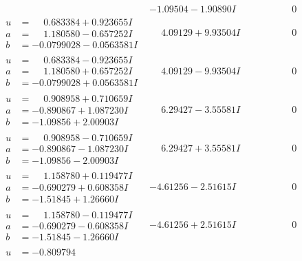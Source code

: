 \documentclass[1p]{elsarticle_modified}
\theoremstyle{definition}
\begin{document}
$$\begin{array}{c|c|c}
 & -1.09504 - 1.90890 I & \phantom{-0.000000 } 0 \\ \hline\begin{aligned}
u &= \phantom{-}0.683384 + 0.923655 I \\
a &= \phantom{-}1.180580 - 0.657252 I \\
b &= -0.0799028 - 0.0563581 I\end{aligned}
 & \phantom{-}4.09129 + 9.93504 I & \phantom{-0.000000 } 0 \\ \hline\begin{aligned}
u &= \phantom{-}0.683384 - 0.923655 I \\
a &= \phantom{-}1.180580 + 0.657252 I \\
b &= -0.0799028 + 0.0563581 I\end{aligned}
 & \phantom{-}4.09129 - 9.93504 I & \phantom{-0.000000 } 0 \\ \hline\begin{aligned}
u &= \phantom{-}0.908958 + 0.710659 I \\
a &= -0.890867 + 1.087230 I \\
b &= -1.09856 + 2.00903 I\end{aligned}
 & \phantom{-}6.29427 - 3.55581 I & \phantom{-0.000000 } 0 \\ \hline\begin{aligned}
u &= \phantom{-}0.908958 - 0.710659 I \\
a &= -0.890867 - 1.087230 I \\
b &= -1.09856 - 2.00903 I\end{aligned}
 & \phantom{-}6.29427 + 3.55581 I & \phantom{-0.000000 } 0 \\ \hline\begin{aligned}
u &= \phantom{-}1.158780 + 0.119477 I \\
a &= -0.690279 + 0.608358 I \\
b &= -1.51845 + 1.26660 I\end{aligned}
 & -4.61256 - 2.51615 I & \phantom{-0.000000 } 0 \\ \hline\begin{aligned}
u &= \phantom{-}1.158780 - 0.119477 I \\
a &= -0.690279 - 0.608358 I \\
b &= -1.51845 - 1.26660 I\end{aligned}
 & -4.61256 + 2.51615 I & \phantom{-0.000000 } 0 \\ \hline\begin{aligned}
u &= -0.809794\phantom{ +0.000000I} \\

\end{aligned}
\end{array}$$
\end{document}
